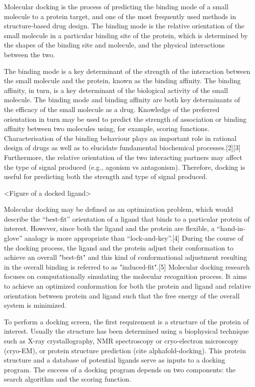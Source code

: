Molecular docking is the process of predicting the binding mode of a small molecule to a protein target, and one of the most frequently used methods in structure-based drug design. The binding mode is the relative orientation of the small molecule in a particular binding site of the protein, which is determined by the shapes of the binding site and molecule, and the physical interactions between the two.

The binding mode is a key determinant of the strength of the interaction between the small molecule and the protein, known as the binding affinity. The binding affinity, in turn, is a key determinant of the biological activity of the small molecule. The binding mode and binding affinity are both key determinants of the efficacy of the small molecule as a drug. Knowledge of the preferred orientation in turn may be used to predict the strength of association or binding affinity between two molecules using, for example, scoring functions. Characterisation of the binding behaviour plays an important role in rational design of drugs as well as to elucidate fundamental biochemical processes.[2][3] Furthermore, the relative orientation of the two interacting partners may affect the type of signal produced (e.g., agonism vs antagonism). Therefore, docking is useful for predicting both the strength and type of signal produced.

<Figure of a docked ligand>

Molecular docking may be defined as an optimization problem, which would describe the “best-fit” orientation of a ligand that binds to a particular protein of interest. However, since both the ligand and the protein are flexible, a “hand-in-glove” analogy is more appropriate than “lock-and-key”.[4] During the course of the docking process, the ligand and the protein adjust their conformation to achieve an overall "best-fit" and this kind of conformational adjustment resulting in the overall binding is referred to as "induced-fit".[5] Molecular docking research focuses on computationally simulating the molecular recognition process. It aims to achieve an optimized conformation for both the protein and ligand and relative orientation between protein and ligand such that the free energy of the overall system is minimized.

To perform a docking screen, the first requirement is a structure of the protein of interest. Usually the structure has been determined using a biophysical technique such as X-ray crystallography, NMR spectroscopy or cryo-electron microscopy (cryo-EM), or protein structure prediction (cite alphafold-docking). This protein structure and a database of potential ligands serve as inputs to a docking program. The success of a docking program depends on two components: the search algorithm and the scoring function.

